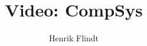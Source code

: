 \documentclass[a4paper,11pt]{article}
\title{Video: CompSys}
\author{Henrik Flindt}
\begin{document}
\maketitle

\begin{sketch}


\end{sketch}
\end{document}

